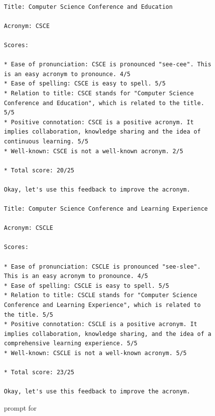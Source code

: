 
\begin{figure}

\tiny
    \captionsetup{justification=centering, labelfont=bf, font=small}
    \begin{verbatim}

Title: Computer Science Conference and Education

Acronym: CSCE

Scores:

* Ease of pronunciation: CSCE is pronounced "see-cee". This is an easy acronym to pronounce. 4/5 
* Ease of spelling: CSCE is easy to spell. 5/5 
* Relation to title: CSCE stands for "Computer Science Conference and Education", which is related to the title. 5/5 
* Positive connotation: CSCE is a positive acronym. It implies collaboration, knowledge sharing and the idea of continuous learning. 5/5 
* Well-known: CSCE is not a well-known acronym. 2/5

* Total score: 20/25

Okay, let's use this feedback to improve the acronym.

Title: Computer Science Conference and Learning Experience

Acronym: CSCLE

Scores:

* Ease of pronunciation: CSCLE is pronounced "see-slee". This is an easy acronym to pronounce. 4/5 
* Ease of spelling: CSCLE is easy to spell. 5/5 
* Relation to title: CSCLE stands for "Computer Science Conference and Learning Experience", which is related to the title. 5/5 
* Positive connotation: CSCLE is a positive acronym. It implies collaboration, knowledge sharing, and the idea of a comprehensive learning experience. 5/5 
* Well-known: CSCLE is not a well-known acronym. 5/5

* Total score: 23/25

Okay, let's use this feedback to improve the acronym.

\end{verbatim}

\caption{\itermod prompt for \acrogen}
    \label{fig:prompt:acronym:refine}
\end{figure}

